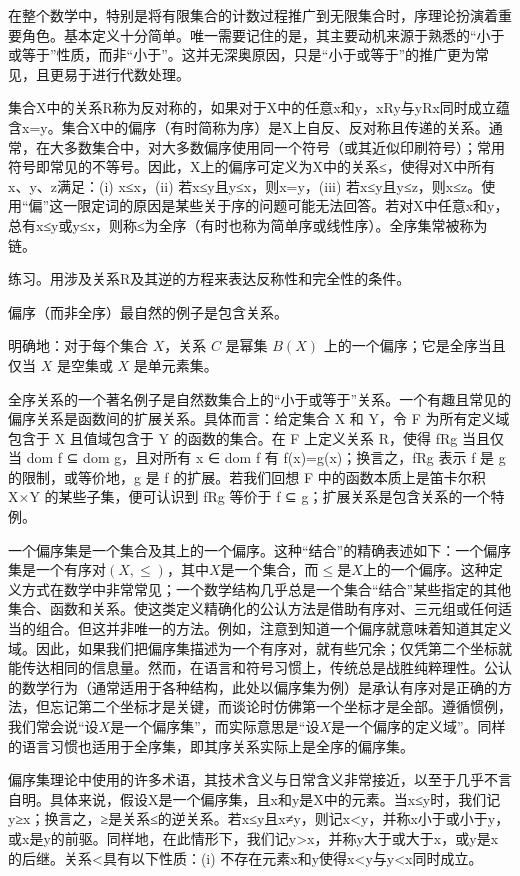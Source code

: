 \documentclass[12pt,a4paper]{ctexbook}
\theoremstyle{definition}
\theoremstyle{remark}
\begin{document}
{在整个数学中，特别是将有限集合的计数过程推广到无限集合时，序理论扮演着重要角色。基本定义十分简单。唯一需要记住的是，其主要动机来源于熟悉的“小于或等于”性质，而非“小于”。这并无深奥原因，只是“小于或等于”的推广更为常见，且更易于进行代数处理。

集合X中的关系R称为反对称的，如果对于X中的任意x和y，xRy与yRx同时成立蕴含x=y。集合X中的偏序（有时简称为序）是X上自反、反对称且传递的关系。通常，在大多数集合中，对大多数偏序使用同一个符号（或其近似印刷符号）；常用符号即常见的不等号。因此，X上的偏序可定义为X中的关系≤，使得对X中所有x、y、z满足：(i) x≤x，(ii) 若x≤y且y≤x，则x=y，(iii) 若x≤y且y≤z，则x≤z。使用“偏”这一限定词的原因是某些关于序的问题可能无法回答。若对X中任意x和y，总有x≤y或y≤x，则称≤为全序（有时也称为简单序或线性序）。全序集常被称为链。

练习。用涉及关系R及其逆的方程来表达反称性和完全性的条件。

偏序（而非全序）最自然的例子是包含关系。

明确地：对于每个集合 \(X\)，关系 \(C\) 是幂集 \(B(X)\) 上的一个偏序；它是全序当且仅当 \(X\) 是空集或 \(X\) 是单元素集。

全序关系的一个著名例子是自然数集合上的“小于或等于”关系。一个有趣且常见的偏序关系是函数间的扩展关系。具体而言：给定集合 X 和 Y，令 F 为所有定义域包含于 X 且值域包含于 Y 的函数的集合。在 F 上定义关系 R，使得 fRg 当且仅当 dom f ⊆ dom g，且对所有 x ∈ dom f 有 f(x)=g(x)；换言之，fRg 表示 f 是 g 的限制，或等价地，g 是 f 的扩展。若我们回想 F 中的函数本质上是笛卡尔积 X×Y 的某些子集，便可认识到 fRg 等价于 f ⊆ g；扩展关系是包含关系的一个特例。

一个偏序集是一个集合及其上的一个偏序。这种“结合”的精确表述如下：一个偏序集是一个有序对\((X, \leq)\)，其中\(X\)是一个集合，而\(\leq\)是\(X\)上的一个偏序。这种定义方式在数学中非常常见；一个数学结构几乎总是一个集合“结合”某些指定的其他集合、函数和关系。使这类定义精确化的公认方法是借助有序对、三元组或任何适当的组合。但这并非唯一的方法。例如，注意到知道一个偏序就意味着知道其定义域。因此，如果我们把偏序集描述为一个有序对，就有些冗余；仅凭第二个坐标就能传达相同的信息量。然而，在语言和符号习惯上，传统总是战胜纯粹理性。公认的数学行为（通常适用于各种结构，此处以偏序集为例）是承认有序对是正确的方法，但忘记第二个坐标才是关键，而谈论时仿佛第一个坐标才是全部。遵循惯例，我们常会说“设\(X\)是一个偏序集”，而实际意思是“设\(X\)是一个偏序的定义域”。同样的语言习惯也适用于全序集，即其序关系实际上是全序的偏序集。

偏序集理论中使用的许多术语，其技术含义与日常含义非常接近，以至于几乎不言自明。具体来说，假设X是一个偏序集，且x和y是X中的元素。当x≤y时，我们记y≥x；换言之，≥是关系≤的逆关系。若x≤y且x≠y，则记x<y，并称x小于或小于y，或x是y的前驱。同样地，在此情形下，我们记y>x，并称y大于或大于x，或y是x的后继。关系<具有以下性质：(i) 不存在元素x和y使得x<y与y<x同时成立。

}
\end{document}
